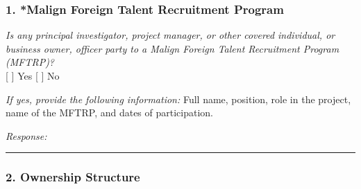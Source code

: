 \documentclass[
]{article}
\begin{document}
\subsubsection{1. *Malign Foreign Talent Recruitment
Program}\label{1-malign-foreign-talent-recruitment-program}

\emph{Is any principal investigator, project manager, or other covered
individual, or business owner, officer party to a Malign Foreign Talent
Recruitment Program (MFTRP)?}\\
{[} {]} Yes {[} {]} No

\emph{If yes, provide the following information:} Full name, position,
role in the project, name of the MFTRP, and dates of participation.

\emph{Response:}

\begin{center}\rule{0.5\linewidth}{0.5pt}\end{center}

\subsubsection{2. Ownership Structure}\label{2-ownership-structure}
\end{document}
